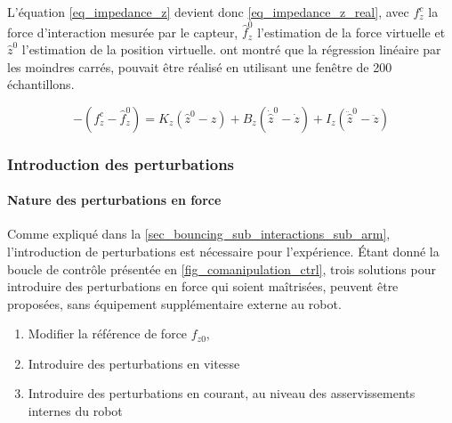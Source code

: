 \documentclass[12pt, a4paper]{article} %
\numberwithin{equation}{section}
\begin{document}
%
\newlineBlank
%
L'équation \cref{eq_impedance_z} devient donc \cref{eq_impedance_z_real}, avec $ f_{z}^c $ la force d'interaction mesurée par le capteur, $ \hat{f}_z^0 $ l'estimation de la force virtuelle et $ \hat{z}^0 $ l'estimation de la position virtuelle. \cite{erden_end-point_2015} ont montré que la régression linéaire par les moindres carrés, pouvait être réalisé en utilisant une fenêtre de 200 échantillons.

\begin{equation} \label{eq_impedance_z_real}
	-(f_{z}^c - \hat{f}_z^0) = K_z (\hat{z}^0 - z) + B_z (\dot{\hat{z}}^0 - \dot{z}) + I_z (\ddot{\hat{z}}^0 - \ddot{z})
\end{equation}

\subsubsection{Introduction des perturbations} \label{sec_impedance_estimation_sub_tools_sub_perturbations}

\paragraph{Nature des perturbations en force}

Comme expliqué dans la \cref{sec_bouncing_sub_interactions_sub_arm}, l'introduction de perturbations est nécessaire pour l'expérience. Étant donné la boucle de contrôle présentée en \cref{fig_comanipulation_ctrl}, trois solutions pour introduire des perturbations en force qui soient maîtrisées, peuvent être proposées, sans équipement supplémentaire externe au robot.

\begin{enumerate}
	\item Modifier la référence de force $ f_{z0} $,
	\item Introduire des perturbations en vitesse
	\item Introduire des perturbations en courant, au niveau des asservissements internes du robot 
\end{enumerate}
\end{document}
